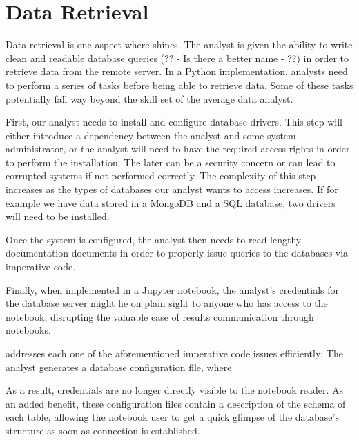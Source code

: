 \section{Data Retrieval}
\label{section:dataretrieval}


Data retrieval is one aspect where {\projname} shines. The analyst is given the ability to write clean and readable database queries (?? - Is there a better name - ??) in order to retrieve data from the remote server. In a Python implementation, analysts need to perform a series of tasks before being able to retrieve data. Some of these tasks potentially fall way beyond the skill set of the average data analyst. 

First, our analyst needs to install and configure database drivers. This step will either introduce a dependency between the analyst and some system administrator, or the analyst will need to have the required access rights in order to perform the installation. The later can be a security concern or can lead to corrupted systems if not performed correctly. The complexity of this step increases as the types of databases our analyst wants to access increases. If for example we have data stored in a MongoDB and a SQL database, two drivers will need to be installed.

Once the system is configured, the analyst then needs to read lengthy documentation documents in order to properly issue queries to the databases via imperative code.

Finally, when implemented in a Jupyter notebook, the analyst's credentials for the database server might lie on plain sight to anyone who has access to the notebook, disrupting the valuable ease of results communication through notebooks.

{\projname} addresses each one of the aforementioned imperative code issues efficiently: The analyst generates a database configuration file, where 

As a result, credentials are no longer directly visible to the notebook reader. As an added benefit, these configuration files contain a description of the schema of each table, allowing the notebook user to get a quick glimpse of the database's structure as soon as connection is established.

